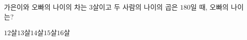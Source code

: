 가은이와 오빠의 나이의 차는 $3$살이고 두 사람의 나이의 곱은 $180$일 때, 오빠의 나이는?
\begin{choices32}{$12$살}{$13$살}{$14$살}{$15$살}{$16$살}\end{choices32}
